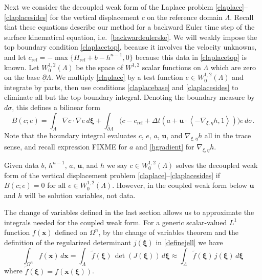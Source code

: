 \documentclass[letterpaper,final,12pt,reqno]{amsart}
\newcommand{\grad}{\nabla}
\newcommand{\bu}{\mathbf{u}}
\newcommand{\bx}{\mathbf{x}}
\newcommand{\bxi}{\bm{\xi}}
\newcommand{\cref}{c_{\text{ref}}}
\newcommand{\Href}{H_{\text{ref}}}
\begin{document}
Next we consider the decoupled weak form of the Laplace problem \eqref{claplace}--\eqref{claplacesides} for the vertical displacement $c$ on the reference domain $\Lambda$.  Recall that these equations describe our method for a backward Euler time step of the surface kinematical equation, i.e.~\eqref{backwardeulerske}.  We will weakly impose the top boundary condition \eqref{claplacetop}, because it involves the velocity unknowns, and let $\cref=-\max\{\Href+b-h^{n-1},0\}$ because this data in \eqref{claplacetop} is known.  Let $W_0^{1,2}(\Lambda)$ be the space of $W^{1,2}$ scalar functions on $\Lambda$ which are zero on the base $\underline{\partial} \Lambda$.  We multiply \eqref{claplace} by a test function $e \in W_0^{1,2}(\Lambda)$ and integrate by parts, then use conditions \eqref{claplacebase} and \eqref{claplacesides} to eliminate all but the top boundary integral.  Denoting the boundary measure by $d\sigma$, this defines a bilinear form
\begin{equation}
B(c;e) = \int_\Lambda \grad c \cdot \grad e \,d\bxi + \int_{\overline{\partial} \Lambda} \Big(c - \cref + \Delta t(a + \bu\cdot \left<-\grad_{\xi,\eta} h,1\right>)\Big) e\,d\sigma. \label{defineB}
\end{equation}
Note that the boundary integral evaluates $c$, $e$, $a$, $\bu$, and $\grad_{\xi,\eta} h$ all in the trace sense, and recall expression FIXME for $a$ and \eqref{hgradient} for $\grad_{\xi,\eta} h$.

Given data $b$, $h^{n-1}$, $a$, $\bu$, and $h$ we say $c \in W_0^{1,2}(\Lambda)$ solves the decoupled weak form of the vertical displacement problem \eqref{claplace}--\eqref{claplacesides} if $B(c;e)=0$ for all $e \in W_0^{1,2}(\Lambda)$.  However, in the coupled weak form below $\bu$ and $h$ will be solution variables, not data.

The change of variables defined in the last section allows us to approximate the integrals needed for the coupled weak form.  For a generic scalar-valued $L^1$ function $f(\bx)$ defined on $\Omega^n$, by the change of variables theorem and the definition of the regularized determinant $j(\bxi)$ in \eqref{definejell} we have
\begin{equation}
\int_{\Omega^n} f(\bx)\,d\bx = \int_\Lambda \tilde f(\bxi) \, \det(J(\bxi))\,d\bxi \approx \int_\Lambda \tilde f(\bxi) \, j(\bxi)\,d\bxi \label{changeintegral}
\end{equation}
where $\tilde f(\bxi) = f(\bx(\bxi))$.
\end{document}
